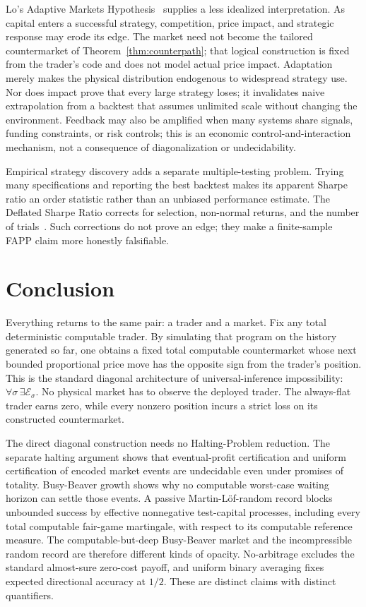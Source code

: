 \documentclass[aps,pra,reprint,superscriptaddress,amsmath,amssymb,floatfix]{revtex4-2}
\theoremstyle{plain}
\theoremstyle{definition}
\theoremstyle{remark}
\begin{document}
Lo's Adaptive Markets Hypothesis~\cite{Lo2004} supplies a less idealized
interpretation. As capital enters a successful strategy, competition, price
impact, and strategic response may erode its edge. The market need not become
the tailored countermarket of Theorem~\ref{thm:counterpath}; that logical
construction is fixed from the trader's code and does not model actual price
impact. Adaptation merely makes the physical distribution endogenous to
widespread strategy use. Nor does impact prove that every large strategy
loses; it invalidates naive extrapolation from a backtest that assumes
unlimited scale without changing the environment. Feedback may also be
amplified when many systems share signals, funding constraints, or risk
controls; this is an economic control-and-interaction mechanism, not a
consequence of diagonalization or undecidability.

Empirical strategy discovery adds a separate multiple-testing problem. Trying
many specifications and reporting the best backtest makes its apparent Sharpe
ratio an order statistic rather than an unbiased performance estimate. The
Deflated Sharpe Ratio corrects for selection, non-normal returns, and the
number of trials~\cite{BaileyLopez2014}. Such corrections do not prove an edge;
they make a finite-sample FAPP claim more honestly falsifiable.

\section{Conclusion}
\label{sec:conclusion}

Everything returns to the same pair: a trader and a market. Fix any total
deterministic computable trader. By simulating that program on the history
generated so far, one obtains a fixed total computable countermarket whose
next bounded proportional price move has the opposite sign from the trader's
position. This is the standard diagonal architecture of universal-inference
impossibility: \(\forall\sigma\,\exists\mathcal E_\sigma\). No physical market
has to observe the deployed trader. The always-flat trader earns zero, while
every nonzero position incurs a strict loss on its constructed countermarket.

The direct diagonal construction needs no Halting-Problem reduction. The
separate halting argument shows that eventual-profit certification and uniform
certification of encoded market events are undecidable even under promises of
totality. Busy-Beaver growth shows why no computable worst-case waiting horizon
can settle those events. A passive Martin-L\"of-random record blocks unbounded
success by effective nonnegative test-capital processes, including every total
computable fair-game martingale, with respect to its computable reference
measure. The computable-but-deep Busy-Beaver market and the incompressible
random record are therefore different kinds of opacity. No-arbitrage excludes
the standard almost-sure zero-cost payoff, and uniform binary averaging fixes
expected directional accuracy at \(1/2\). These are distinct claims with
distinct quantifiers.
\end{document}
